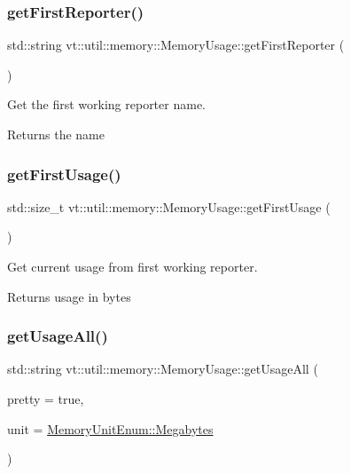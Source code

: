 \subsubsection{\texorpdfstring{get\+First\+Reporter()}{getFirstReporter()}}
{\footnotesize\ttfamily std\+::string vt\+::util\+::memory\+::\+Memory\+Usage\+::get\+First\+Reporter (\begin{DoxyParamCaption}{ }\end{DoxyParamCaption})}



Get the first working reporter name. 

\begin{DoxyReturn}{Returns}
the name 
\end{DoxyReturn}
\mbox{\label{structvt_1_1util_1_1memory_1_1_memory_usage_ab02282aab80eb52e5f8f43095af05304}} 
\subsubsection{\texorpdfstring{get\+First\+Usage()}{getFirstUsage()}}
{\footnotesize\ttfamily std\+::size\+\_\+t vt\+::util\+::memory\+::\+Memory\+Usage\+::get\+First\+Usage (\begin{DoxyParamCaption}{ }\end{DoxyParamCaption})}



Get current usage from first working reporter. 

\begin{DoxyReturn}{Returns}
usage in bytes 
\end{DoxyReturn}
\mbox{\label{structvt_1_1util_1_1memory_1_1_memory_usage_aa37f5b634fb87151fc1688cdba759298}} 
\subsubsection{\texorpdfstring{get\+Usage\+All()}{getUsageAll()}}
{\footnotesize\ttfamily std\+::string vt\+::util\+::memory\+::\+Memory\+Usage\+::get\+Usage\+All (\begin{DoxyParamCaption}\item[{bool}]{pretty = {\ttfamily true},  }\item[{\hyperlink{namespacevt_1_1util_1_1memory_a64df3d84293b34009f78e2a1db2f9bb6}{Memory\+Unit\+Enum}}]{unit = {\ttfamily \hyperlink{namespacevt_1_1util_1_1memory_a64df3d84293b34009f78e2a1db2f9bb6a2276a1b157f2813f3b65d04c0b1c56f6}{Memory\+Unit\+Enum\+::\+Megabytes}} }\end{DoxyParamCaption})}



